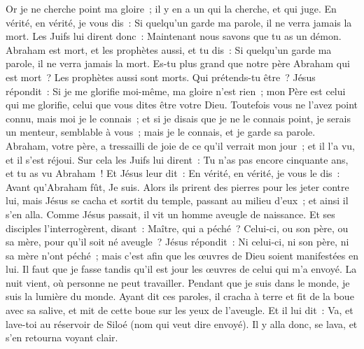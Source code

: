\begin{multicols}{2}
Or je ne cherche point ma gloire~; il y en a un qui la cherche, et qui juge.
En vérité, en vérité, je vous dis~: Si quelqu'un garde ma parole, il ne verra jamais la mort.
Les Juifs lui dirent donc~: Maintenant nous savons que tu as un démon. Abraham est mort, et les prophètes aussi, et tu dis~: Si quelqu'un garde ma parole, il ne verra jamais la mort.
Es-tu plus grand que notre père Abraham qui est mort~? Les prophètes aussi sont morts. Qui prétends-tu être~?
Jésus répondit~: Si je me glorifie moi-même, ma gloire n'est rien~; mon Père est celui qui me glorifie, celui que vous dites être votre Dieu.
Toutefois vous ne l'avez point connu, mais moi je le connais~; et si je disais que je ne le connais point, je serais un menteur, semblable à vous~; mais je le connais, et je garde sa parole.
Abraham, votre père, a tressailli de joie de ce qu'il verrait mon jour~; et il l'a vu, et il s'est réjoui.
Sur cela les Juifs lui dirent~: Tu n'as pas encore cinquante ans, et tu as vu Abraham~!
Et Jésus leur dit~: En vérité, en vérité, je vous le dis~: Avant qu'Abraham fût, Je suis.
Alors ils prirent des pierres pour les jeter contre lui, mais Jésus se cacha et sortit du temple, passant au milieu d'eux~; et ainsi il s'en alla.
\VerseOne{}Comme Jésus passait, il vit un homme aveugle de naissance.
Et ses disciples l'interrogèrent, disant~: Maître, qui a péché~? Celui-ci, ou son père, ou sa mère, pour qu'il soit né aveugle~?
Jésus répondit~: Ni celui-ci, ni son père, ni sa mère n'ont péché~; mais c'est afin que les œuvres de Dieu soient manifestées en lui.
Il faut que je fasse tandis qu'il est jour les œuvres de celui qui m'a envoyé. La nuit vient, où personne ne peut travailler.
Pendant que je suis dans le monde, je suis la lumière du monde.
Ayant dit ces paroles, il cracha à terre et fit de la boue avec sa salive, et mit de cette boue sur les yeux de l'aveugle.
Et il lui dit~: Va, et lave-toi au réservoir de Siloé (nom qui veut dire envoyé). Il y alla donc, se lava, et s'en retourna voyant clair.

\end{multicols}
